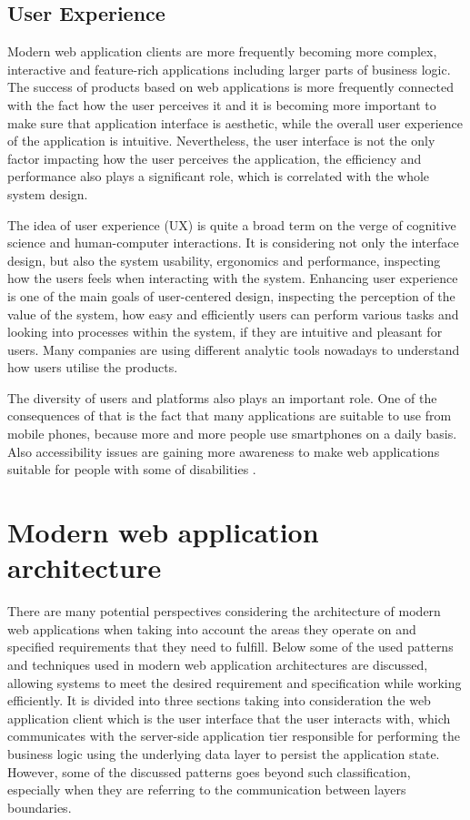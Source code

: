 \subsection*{User Experience}

Modern web application clients are more frequently becoming more complex, interactive and feature-rich applications including larger parts of business logic. The success of products based on web applications is more frequently connected with the fact how the user perceives it and it is becoming more important to make sure that application interface is aesthetic, while the overall user experience of the application is intuitive. Nevertheless, the user interface is not the only factor impacting how the user perceives the application, the efficiency and performance also plays a significant role, which is correlated with the whole system design.

The idea of user experience (UX) is quite a broad term on the verge of cognitive science and human-computer interactions. It is considering not only the interface design, but also the system usability, ergonomics and performance, inspecting how the users feels when interacting with the system. Enhancing user experience is one of the main goals of user-centered design, inspecting the perception of the value of the system, how easy and efficiently users can perform various tasks and looking into processes within the system, if they are intuitive and pleasant for users. Many companies are using different analytic tools nowadays  to understand how users utilise the products.

The diversity of users and platforms also plays an important role. One of the consequences of that is the fact that many applications are suitable to use from mobile phones, because more and more people use smartphones on a daily basis. Also accessibility issues are gaining more awareness to make web applications suitable for people with some of disabilities \cite{WhatIsUserExperienceDesign}.

\section{Modern web application architecture}

There are many potential perspectives considering the architecture of modern web applications when taking into account the areas they operate on and specified requirements that they need to fulfill. Below some of the used patterns and techniques used in modern web application architectures are discussed, allowing systems to meet the desired requirement and specification while working efficiently. It is divided into three sections taking into consideration the web application client which is the user interface that the user interacts with, which communicates with the server-side application tier responsible for performing the business logic using the underlying data layer to persist the application state. However, some of the discussed patterns goes beyond such classification, especially when they are referring to the communication between layers boundaries.

